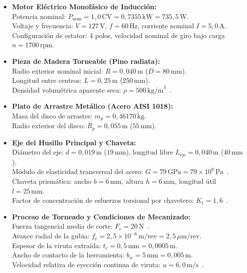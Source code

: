\documentclass[12pt,a4paper]{article}
\begin{document}
\begin{itemize}[leftmargin=20pt, itemsep=8pt, parsep=3pt, topsep=6pt]
    \item \textbf{Motor Eléctrico Monofásico de Inducción:}\\
    Potencia nominal: $P_{\text{nom}} = 1{,}0\,\text{CV} = 0{,}7355\,\text{kW} = 735{,}5\,\text{W}$.\\
    Voltaje y frecuencia: $V = 127\,\text{V}$, $f = 60\,\text{Hz}$, corriente nominal $I = 5{,}0\,\text{A}$.\\
    Configuración de estator: 4 polos, velocidad nominal de giro bajo carga $n = 1700\,\text{rpm}$.

    \item \textbf{Pieza de Madera Torneable (Pino radiata):}\\
    Radio exterior nominal inicial: $R = 0{,}040\,\text{m}$ ($D = 80\,\text{mm}$).\\
    Longitud entre centros: $L = 0{,}25\,\text{m}$ ($250\,\text{mm}$).\\
    Densidad volumétrica aparente seca: $\rho = 500\,\text{kg/m}^3$~\cite{kivimaa1950, eyma2004}.

    \item \textbf{Plato de Arrastre Metálico (Acero AISI 1018):}\\
    Masa del disco de arrastre: $m_p = 0{,}46170\,\text{kg}$.\\
    Radio exterior del disco: $R_p = 0{,}055\,\text{m}$ ($55\,\text{mm}$).

    \item \textbf{Eje del Husillo Principal y Chaveta:}\\
    Diámetro del eje: $d = 0{,}019\,\text{m}$ ($19\,\text{mm}$), longitud libre $L_{\text{eje}} = 0{,}040\,\text{m}$ ($40\,\text{mm}$).\\
    Módulo de elasticidad transversal del acero: $G = 79\,\text{GPa} = 79\times 10^9\,\text{Pa}$~\cite{shigley2015}.\\
    Chaveta prismática: ancho $b = 6\,\text{mm}$, altura $h = 6\,\text{mm}$, longitud útil $l = 25\,\text{mm}$.\\
    Factor de concentración de esfuerzos torsional por chavetero: $K_t = 1{,}6$~\cite{shigley2015}.

    \item \textbf{Proceso de Torneado y Condiciones de Mecanizado:}\\
    Fuerza tangencial media de corte: $F_c = 20\,\text{N}$~\cite{franz1958, naylor2012}.\\
    Avance radial de la gubia: $f_r = 2{,}5\times 10^{-6}\,\text{m/rev} = 2{,}5\,\mu\text{m/rev}$.\\
    Espesor de la viruta extraída: $t_c = 0{,}5\,\text{mm} = 0{,}0005\,\text{m}$.\\
    Ancho de contacto de la herramienta: $b_w = 5\,\text{mm} = 0{,}005\,\text{m}$.\\
    Velocidad relativa de eyección continua de viruta: $u = 6{,}0\,\text{m/s}$~\cite{eyma2004}.


\end{itemize}
\end{document}
